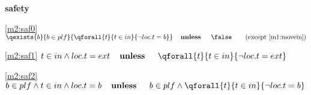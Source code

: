 \textbf{safety}
\begin{block}
\item[ \eqref{m2:saf0} ]$\qexists{b}{b \in plf}{ \qforall{t}{t \in in}{ \neg loc.t = b}}  \textbf{\quad unless \quad} \false\qquad  \text{(except \ref{m1:movein})}$ %
\item[ \eqref{m2:saf1} ]$t \in in \land loc.t = ext  \textbf{\quad unless \quad} \qforall{t}{t \in in}{ \neg loc.t = ext} $ %
\item[ \eqref{m2:saf2} ]$b \in plf \land t \in in \land loc.t = b  \textbf{\quad unless \quad} b \in plf \land \qforall{t}{t \in in}{ \neg loc.t = b} $ %
\end{block}
